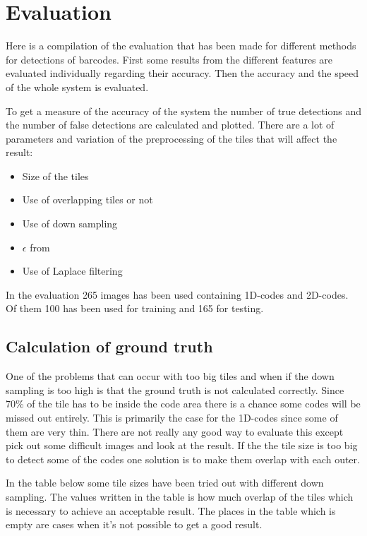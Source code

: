 \chapter{Evaluation}
\label{sec:Evaluation}
Here is a compilation of the evaluation that has been made for different methods for detections of barcodes. First some results from the different features are evaluated individually regarding their accuracy. Then the accuracy and the speed of the whole system is evaluated.

To get a measure of the accuracy of the system the number of true detections and the number of false detections are calculated and plotted. There are a lot of parameters and variation of the preprocessing of the tiles that will affect the result:

 \begin{itemize}
 	\item Size of the tiles
 	\item Use of overlapping tiles or not
 	\item Use of down sampling
 	\item $\epsilon$ from
 	\item Use of Laplace filtering 
 \end{itemize}

In the evaluation 265 images has been used containing 1D-codes and 2D-codes. Of them 100 has been used for training and 165 for testing.

\section{Calculation of ground truth}
\label{sec:Calculation of ground truth}
One of the problems that can occur with too big tiles and when if the down sampling is too high is that the ground truth is not calculated correctly. Since 70\% of the tile has to be inside the code area there is a chance some codes will be missed out entirely. This is primarily the case for the 1D-codes since some of them are very thin. There are not really any good way to evaluate this except pick out some difficult images and look at the result. If the the tile size is too big to detect some of the codes one solution is to make them overlap with each outer. 

In the table below some tile sizes have been tried out with different down sampling. The values written in the table is how much overlap of the tiles which is necessary to achieve an acceptable result. The places in the table which is empty are cases when it's not possible to get a good result.

